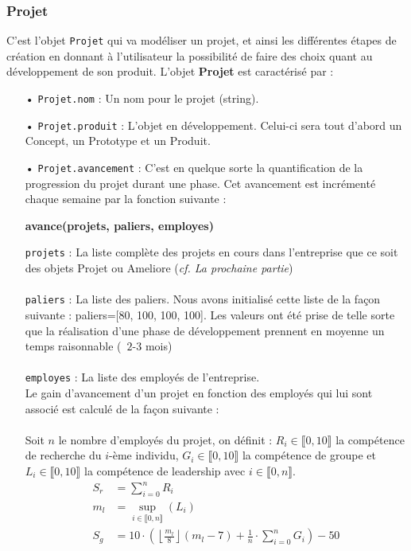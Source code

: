 \subsubsection{Projet}
\noindent
	C'est l'objet \texttt{Projet} qui va modéliser un projet, et ainsi les différentes étapes de création en donnant à l'utilisateur la possibilité de faire des choix quant au développement de son produit.
	L'objet \textbf{Projet} est caractérisé par :
	\begin{enumerate}
	\item[•] \texttt{Projet.nom} : Un nom pour le projet (string).
	\item[•] \texttt{Projet.produit} : L'objet en développement. Celui-ci sera tout d'abord un Concept, un Prototype et un Produit.
	\item[•] \texttt{Projet.avancement} : C'est en quelque sorte la quantification de la progression du projet durant une phase. Cet avancement est incrémenté chaque semaine par la fonction suivante :
\begin{center}
	\textbf{avance(projets, paliers, employes)}
\end{center}
	\texttt{projets} : La liste complète des projets en cours dans l'entreprise que ce soit des objets Projet ou Ameliore (\textit{cf. La prochaine partie}) \\ \\
	\texttt{paliers} : La liste des paliers. Nous avons initialisé cette liste de la façon suivante : paliers=[80, 100, 100, 100]. Les valeurs ont été prise de telle sorte que la réalisation d'une phase de développement prennent en moyenne un temps raisonnable (~$2$-$3$ mois) \\ \\
	\texttt{employes} : La liste des employés de l'entreprise.\\
	
	Le gain d'avancement d'un projet en fonction des employés qui lui sont associé est calculé de la façon suivante : \\ \\
\noindent	
Soit $n$ le nombre d'employés du projet, on définit : $R_{i} \in \llbracket 0, 10 \rrbracket$ la compétence de recherche du $i$-ème individu, $G_{i} \in \llbracket 0, 10 \rrbracket$ la compétence de groupe et $L_{i} \in \llbracket 0, 10 \rrbracket$ la compétence de leadership avec $i \in \llbracket 0, n \rrbracket$. 
	\begin{align*}
		S_{r} &= \sum_{i=0}^{n} R_{i}\\
		m_{l} &= \underset{i \in \llbracket 0, n \rrbracket}{\sup} (L_{i}) \\
		S_{g} &= 10\cdot\left( \left\lfloor \frac{m_{l}}{8} \right\rfloor \left(m_{l}-7\right) + \frac{1}{n}\cdot \sum_{i=0}^{n} G_{i}\right) -50		
	\end{align*}
	

\end{enumerate}
